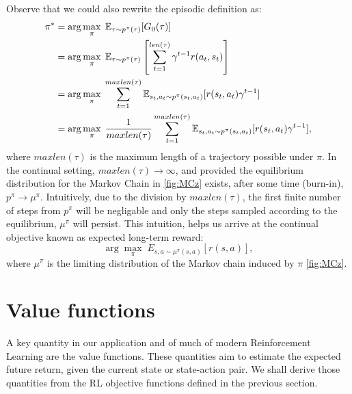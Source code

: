 \documentclass{report}
\numberwithin{equation}{section}
\numberwithin{figure}{section}
\numberwithin{table}{section}
\numberwithin{algorithm}{section}
\begin{document}
Observe that we could also rewrite the episodic definition as:
\begin{align}
  \label{eq:cont_objective}
  \pi^*&=\arg \max_{\pi}\; \mathbb{E}_{\tau\sim p^{\pi}(\tau)}[G_0(\tau)]\notag\\
  &=\arg \max_{\pi}\; \mathbb{E}_{\tau\sim p^{\pi}(\tau)}\left[\sum_{t=1}^{len(\tau)}\gamma^{t-1}r(a_{t}, s_{t})\right]\\
  &=\arg \max_{\pi}\; \sum_{t=1}^{maxlen(\tau)}\mathbb{E}_{s_{t}, a_{t}\sim p^{\pi}(s_{t}, a_{t})}[r(s_t, a_t)\gamma^{t-1}]\\
  &=\arg \max_{\pi}\; \frac{1}{maxlen(\tau)}\sum_{t=1}^{maxlen(\tau)}\mathbb{E}_{s_{t}, a_{t}\sim p^{\pi}(s_{t}, a_{t})}[r(s_{t}, a_{t})\gamma^{t-1}],
\end{align}
where $maxlen(\tau)$ is the maximum length of a trajectory possible under $\pi$. 
In the continual setting, $maxlen(\tau)\rightarrow\infty$, and provided the 
equilibrium distribution for the Markov Chain in \ref{fig:MCz} exists, 
after some time (burn-in), $p^{\pi}\rightarrow \mu^{\pi}$. Intuitively,
 due to the division by $maxlen(\tau)$, 
the first finite number of steps from $p^{\pi}$ 
will be negligable and only the steps sampled according to the equilibrium, 
$\mu^{\pi}$ will persist. This intuition, helps us arrive at the 
continual objective known as expected long-term reward:
\begin{equation}\label{eq:continualObjective}
  \arg \max_{\pi}\; {E}_{s, a\sim \mu^{\pi}(s, a)}[r(s, a)],
\end{equation}
where $\mu^{\pi}$ is the limiting distribution of the Markov chain 
induced by $\pi$ \ref{fig:MCz}.



\section{Value functions}\label{sec:valueFuncs}
A key quantity in our application and of much of modern Reinforcement Learning 
are the value functions. These quantities aim to estimate the 
expected future return, given the current state or state-action pair. 
We shall derive those quantities from the RL objective functions 
defined in the previous section.
\end{document}
